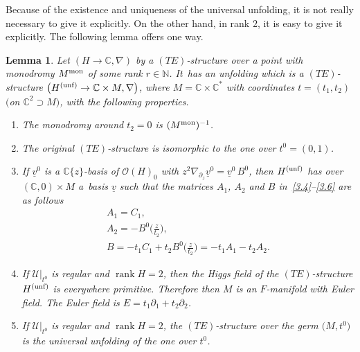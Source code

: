 \documentclass[10pt,a4paper]{amsart}
\numberwithin{equation}{section}
\numberwithin{figure}{section}
\newcommand{\N}{{\mathbb N}}
\newcommand{\C}{{\mathbb C}}
\newcommand{\OO}{{\mathcal O}}
\newcommand{\UU}{{\mathcal U}}
\newcommand{\uuuu}{\underline}
\newcommand{\paa}{\partial}
\newcommand{\nnn}{\nabla}
\DeclareMathOperator{\rank}{rank}
\newtheorem{Lemma}[Theorem]{Lemma}
\begin{document}
Because of the existence and uniqueness of the universal
unfolding, it is not really necessary
to give it explicitly. On the other hand, in rank $2$,
it is easy to give it explicitly.
The following lemma offers one way.


\begin{Lemma}\label{t5.2}
Let $(H\to\C,\nnn)$ by a $(TE)$-structure over
a point with monodromy $M^{\rm mon}$ of some rank $r\in\N$. It~has an unfolding which is a $(TE)$-structure
$\big(H^{\rm (unf)}\to \C\times M,\nnn\big)$, where
$M=\C\times\C^*$ with coordinates $t=(t_1,t_2)$
$($on $\C^2\supset M)$, with the following properties.
\begin{enumerate}\itemsep=0pt
\item[$(a)$] The monodromy around $t_2=0$ is $(M^{\rm mon})^{-1}$.

\item[$(b)$] The original $(TE)$-structure is isomorphic to the
one over $t^0=(0,1)$.

\item[$(c)$] If $\uuuu{v}^0$ is a $\C\{z\}$-basis of $\OO(H)_0$
with $z^2\nnn_{\paa_z}\uuuu{v}^0=\uuuu{v}^0\, B^0$, then
$H^{\rm (unf)}$ has over $(\C,0)\times M$ a~basis
$\uuuu{v}$ such that the matrices $A_1$, $A_2$ and $B$
in~\eqref{3.4}--\eqref{3.6} are as follows
\begin{gather}
A_1= C_1,\label{5.2}
\\
A_2= -B^0\bigg(\frac{z}{t_2}\bigg),\label{5.3}
\\
B = -t_1C_1+t_2B^0\bigg(\frac{z}{t_2}\bigg)=-t_1A_1-t_2 A_2.\label{5.4}
\end{gather}

\item[$(d)$] If $\UU|_{t^0}$ is regular and $\rank H=2$, then
the Higgs field of the $(TE)$-structure $H^{\rm (unf)}$
is everywhere primitive. Therefore then $M$ is an $F$-manifold
with Euler field. The Euler field is $E=t_1\paa_1+t_2\paa_2$.

\item[$(e)$] If $\UU|_{t^0}$ is regular and $\rank H=2$,
the $(TE)$-structure over the germ $\big(M,t^0\big)$
is the universal unfolding of the one over $t^0$.
\end{enumerate}
\end{Lemma}
\end{document}
